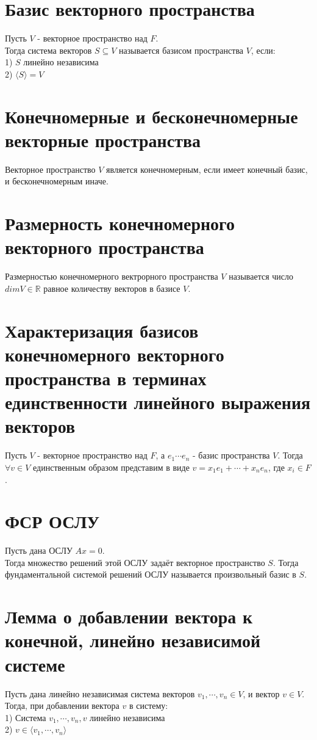 \documentclass[a4paper,11pt]{report}
\begin{document}
\section{Базис векторного пространства}
Пусть $V$ - векторное пространство над $F$.\\
Тогда система векторов $S \subseteq V$ называется базисом пространства $V$, если:\\
1) $S$ линейно независима\\
2) $\langle{S}\rangle = V$\\
\section{Конечномерные и бесконечномерные векторные пространства}
Векторное пространство $V$ является конечномерным, если имеет конечный базис, и бесконечномерным иначе.
\section{Размерность конечномерного векторного пространства}
Размерностью конечномерного вектрорного пространства $V$ называется число $dim V \in \mathbb{R}$ равное количеству
векторов в базисе $V$.
\section{Характеризация базисов конечномерного векторного пространства в терминах единственности линейного выражения
векторов}
Пусть $V$ - векторное пространство над $F$, а $e_1 \cdots e_n$ - базис пространства $V$. 
Тогда $\forall v \in V$ единственным образом представим в виде $v = x_1e_1 + \cdots + x_ne_n$, где $x_i \in F$.
\section{ФСР ОСЛУ}
Пусть дана ОСЛУ $Ax = 0$.\\
Тогда множество решений этой ОСЛУ задаёт векторное пространство $S$. 
Тогда фундаментальной системой решений ОСЛУ называется произвольный базис в $S$.
\section{Лемма о добавлении вектора к конечной, линейно независимой системе}
Пусть дана линейно независимая система векторов $v_1, \cdots, v_n \in V$, и вектор $v \in V$.\\
Тогда, при добавлении вектора $v$ в систему:\\
1) Система $v_1, \cdots, v_n, v$ линейно независима\\
2) $v \in \langle v_1, \cdots, v_n \rangle$
\end{document}
